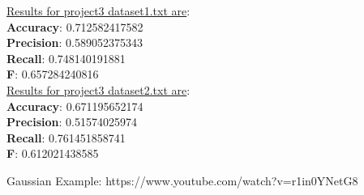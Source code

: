 \documentclass[paper=letter, fontsize=11pt]{article}
\numberwithin{equation}{section}		%
\numberwithin{figure}{section}			%
\numberwithin{table}{section}				%
\begin{document}
\noindent \underline{Results for project3 dataset1.txt are}: \\ 
\textbf{Accuracy}: 0.712582417582\\
\textbf{Precision}: 0.589052375343\\
\textbf{Recall}: 0.748140191881\\
\textbf{F}: 0.657284240816\\

\noindent \underline{Results for project3 dataset2.txt are}:\\
\textbf{Accuracy}: 0.671195652174\\
\textbf{Precision}: 0.51574025974\\
\textbf{Recall}: 0.761451858741\\
\textbf{F}: 0.612021438585\\

\begin{thebibliography}{1}
Gaussian Example: https://www.youtube.com/watch?v=r1in0YNetG8
\end{thebibliography}
\end{document}
